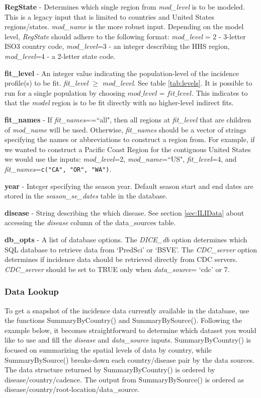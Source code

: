 \documentclass[a4paper]{article}
\begin{document}
 \textbf{RegState} - Determines which single region from \textit{mod\_level} is to be modeled.  This is a legacy input that is limited to countries and United States regions/states.  \textit{mod\_name} is the more robust input.  Depending on the model level, \textit{RegState} should adhere to the following format: \textit{mod\_level} = 2 - 3-letter ISO3 country code, \textit{mod\_level}=3 - an integer describing the HHS region, \textit{mod\_level}=4 - a 2-letter state code.

 \textbf{fit\_level} - An integer value indicating the population-level of the incidence profile(s) to be fit.  \textit{fit\_level} $\geq$ \textit{mod\_level}.  See table \ref{tab:levels}. It is possible to run  for a single population by choosing $mod\_level=fit\_level$.  This indicates to  that the \textit{model} region is to be fit directly with no higher-level indirect fits.

 \textbf{fit\_names} - If \textit{fit\_names}==``all", then all regions at \textit{fit\_level} that are children of \textit{mod\_name} will be used.  Otherwise, \textit{fit\_names} should be a vector of strings specifying the names or abbreviations to construct a region from.  For example, if we wanted to construct a Pacific Coast Region for the contiguous United States we would use the inputs: \textit{mod\_level}=2, \textit{mod\_name}=``US", \textit{fit\_level}=4, and \textit{fit\_names}=\verb|c("CA", "OR", "WA")|.

 \textbf{year} - Integer specifying the season year. Default season start and end dates are stored in the \textit{season\_se\_dates} table in the database.

 \textbf{disease} - String describing the which disease.  See section \ref{sec:ILIData} about accessing the \textit{disease} column of the data\_sources table.

 \textbf{db\_opts} - A list of database options.  The \textit{DICE\_db} option determines which SQL database to retrieve data from `PredSci' or `BSVE'.  The \textit{CDC\_server} option determines if incidence data should be retrieved directly from CDC servers.  \textit{CDC\_server} should be set to TRUE only when \textit{data\_source}= `cdc' or 7.


\subsubsection*{Data Lookup}
To get a snapshot of the incidence data currently available in the  database, use the functions SummaryByCountry() and SummaryBySource().  Following the example below, it becomes straightforward to determine which dataset you would like to use and fill the \textit{disease} and \textit{data\_source} inputs.  SummaryByCountry() is focused on summarizing the spatial levels of data by country, while SummaryBySource() breaks-down each country/disease pair by the data sources.  The data structure returned by SummaryByCountry() is ordered by disease/country/cadence.  The output from SummaryBySource() is ordered as disease/country/root-location/data\_source.
\end{document}
